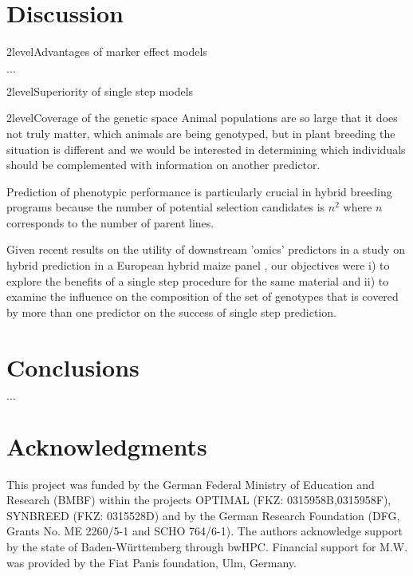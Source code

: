 \documentclass[12pt,titlepage]{article}
\begin{document}
\section*{Discussion}
\Genetics2level{Advantages of marker effect models}

$\dots$

\Genetics2level{Superiority of single step models}


\Genetics2level{Coverage of the genetic space}
Animal populations are so large that it does not truly matter, which animals are 
being genotyped, but in plant breeding the situation is different and we would 
be interested in determining which individuals should be complemented with 
information on another predictor.


Prediction of phenotypic performance is particularly crucial in hybrid breeding
programs because the number of potential selection candidates is $n^{2}$ where
$n$ corresponds to the number of parent lines.

Given recent results on the utility of downstream 'omics' predictors in a study
on hybrid prediction in a European hybrid maize panel \cite{Westhues2017}, our 
objectives were i) to explore the benefits of a single step procedure for the 
same material and ii) to examine the influence on the composition of the set of
genotypes that is covered by more than one predictor on the success of single
step prediction.




\section*{Conclusions}


$\dots$




\section{Acknowledgments} 
This project was funded by the German Federal Ministry of Education and 
Research (BMBF) within the projects OPTIMAL (FKZ: 0315958B,0315958F),
SYNBREED (FKZ: 0315528D) and by the German Research Foundation 
(DFG, Grants No. ME 2260/5-1 and SCHO 764/6-1).
The authors acknowledge support by the state of Baden-W{\"u}rttemberg through 
bwHPC.
Financial support for M.W. was provided by the Fiat Panis foundation, Ulm,
Germany.



\nolinenumbers


\end{document}
